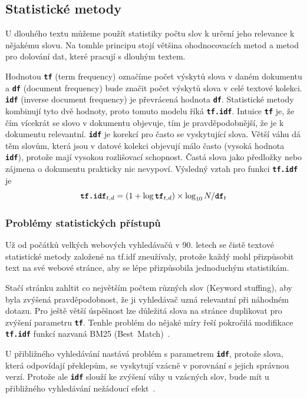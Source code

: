 \documentclass[11pt,letterpaper,oneside,openright]{book}
\newcommand{\bftt}[1]{\texttt{\textbf{#1}}}
\begin{document}
\subsection{Statistické metody}
U dlouhého textu můžeme použít statistiky počtu slov k určení jeho relevance k
nějakému slovu. Na tomhle principu stojí většina ohodnocovacích metod a metod
pro dolování dat, které pracují s dlouhým textem.

Hodnotou \bftt{tf} (term frequency) označíme počet výskytů slova v daném
dokumentu a \bftt{df} (document frequency) bude značit počet výskytů slova v
celé textové kolekci. \bftt{idf} (inverse document frequency) je převrácená
hodnota \bftt{df}. Statistické metody kombinují tyto dvě hodnoty, proto tomuto
modelu říká \bftt{tf.idf}. Intuice \bftt{tf} je, že čím vícekrát se slovo v
dokumentu objevuje, tím je pravděpodobnější, že je k dokumentu relevantní.
\bftt{idf} je korekcí pro často se vyskytující slova. Větší váhu dá těm slovům,
která jsou v datové kolekci objevují málo často (vysoká hodnota \bftt{idf}),
protože mají vysokou rozlišovací schopnost. Častá slova jako předložky nebo
zájmena o dokumentu prakticky nic nevypoví. Výsledný vztah pro funkci
\bftt{tf.idf} je \[\bftt{tf.idf}_{t, d} = (1 + \log \bftt{tf}_{t, d}) \times
\log_{10} N / \bftt{df}_{t}\]

\subsubsection{Problémy statistických přístupů}
Už od počátků velkých webových vyhledávačů v 90. letech se čistě textové
statistické metody založené na tf.idf zneužívaly, protože každý mohl
přizpůsobit text na své webové stránce, aby se lépe přizpůsobila
jednoduchým statistikám.

Stačí stránku zahltit co největším počtem různých slov (Keyword stuffing), aby
byla zvýšená pravděpodobnost, že ji vyhledávač uzná relevantní při náhodném
dotazu. Pro ještě větší úspěšnost lze důležitá slova na stránce duplikovat pro
zvýšení parametru \bftt{tf}. Tenhle problém do nějaké míry řeší pokročilá
modifikace \bftt{tf.idf} funkcí nazvaná BM25
(Best~Match)~\cite{Robertson:2009:PRF:1704809.1704810}.

U přibližného vyhledávání nastává problém s parametrem \bftt{idf}, protože slova,
která odpovídají překlepům, se vyskytují vzácně v porovnání s jejich správnou
verzí. Protože ale \bftt{idf} slouží ke zvýšení váhy u vzácných slov, bude mít
u přibližného vyhledávání nežádoucí efekt~\cite{elastic_fuzzy}.
\end{document}
